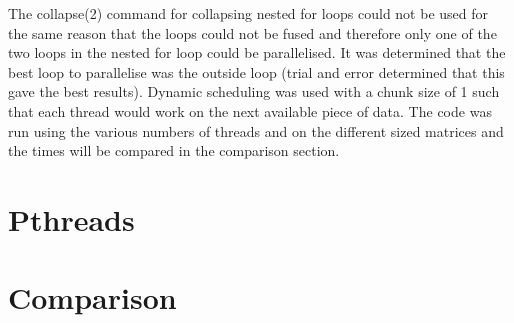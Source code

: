 \documentclass[journal, a4paper]{IEEEtran}
\begin{document}
The collapse(2) command for collapsing nested for loops could not be used for the same reason that the loops could not be fused and therefore only one of the two loops in the nested for loop could be parallelised. It was determined that the best loop to parallelise was the outside loop (trial and error determined that this gave the best results). Dynamic scheduling was used with a chunk size of 1 such that each thread would work on the next available piece of data. The code was run using the various numbers of threads and on the different sized matrices and the times will be compared in the comparison section. 


\section{Pthreads}

\noindent


\section{Comparison}
	
\end{document}
